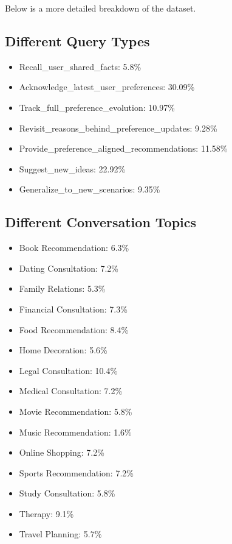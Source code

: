 Below is a more detailed breakdown of the dataset.

\subsection{Different Query Types}

\begin{itemize}
    \item Recall\_user\_shared\_facts: 5.8\%
    \item Acknowledge\_latest\_user\_preferences: 30.09\%
    \item Track\_full\_preference\_evolution: 10.97\%
    \item Revisit\_reasons\_behind\_preference\_updates: 9.28\%
    \item Provide\_preference\_aligned\_recommendations: 11.58\%
    \item Suggest\_new\_ideas: 22.92\%
    \item Generalize\_to\_new\_scenarios: 9.35\%
\end{itemize}

\subsection{Different Conversation Topics}

\begin{itemize}
    \item Book Recommendation: 6.3\%
    \item Dating Consultation: 7.2\%
    \item Family Relations: 5.3\%
    \item Financial Consultation: 7.3\%
    \item Food Recommendation: 8.4\%
    \item Home Decoration: 5.6\%
    \item Legal Consultation: 10.4\%
    \item Medical Consultation: 7.2\%
    \item Movie Recommendation: 5.8\%
    \item Music Recommendation: 1.6\%
    \item Online Shopping: 7.2\%
    \item Sports Recommendation: 7.2\%
    \item Study Consultation: 5.8\%
    \item Therapy: 9.1\%
    \item Travel Planning: 5.7\%
\end{itemize}

